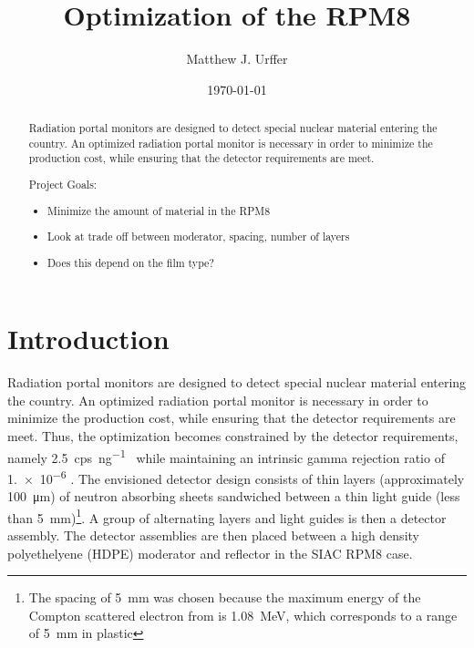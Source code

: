 \documentclass[draftcls,onecolumn]{IEEEtran}
\begin{document}
\title{Optimization of the RPM8}
\author{Matthew J. Urffer}
\date{\today}

\maketitle
\begin{abstract}
Radiation portal monitors are designed to detect special nuclear material entering the country.
An optimized radiation portal monitor is necessary in order to minimize the production cost, while ensuring that the detector requirements are meet.

Project Goals:
\begin{itemize}
	\item Minimize the amount of material in the RPM8
	\item Look at trade off between moderator, spacing, number of layers
	\item Does this depend on the film type?
\end{itemize}
\end{abstract}

\IEEEpeerreviewmaketitle

\pagebreak
\tableofcontents
\listoftodos
\listoffigures
\listoftables
\lstlistoflistings
\pagebreak

\section{Introduction}
Radiation portal monitors are designed to detect special nuclear material entering the country.
An optimized radiation portal monitor is necessary in order to minimize the production cost, while ensuring that the detector requirements are meet.
Thus, the optimization becomes constrained by the detector requirements, namely \SI{2.5}{cps\per\nano\gram{}} while maintaining an intrinsic gamma rejection ratio of \num{1.e-6}  \cite{kouzes_neutron_2010,kouzes_neutron_1999}.
The envisioned detector design consists of thin layers (approximately \SI{100}{\micro\meter}) of  neutron absorbing sheets sandwiched between a thin light guide (less than \SI{5}{\milli \meter})\footnote{The spacing of \SI{5}{\milli \meter} was chosen because the maximum energy of the Compton scattered electron from  is \SI{1.08}{\mega \electronvolt}, which corresponds to a range of \SI{5}{\milli \meter} in plastic}.
A group of alternating layers and light guides is then a detector assembly.
The detector assemblies are then placed between a high density polyethelyene (HDPE) moderator and reflector in the SIAC RPM8 case.
\end{document}
